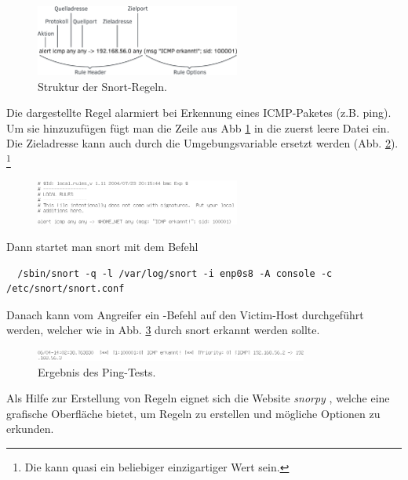 \begin{figure}[H]
\centering
\includegraphics[width=0.6\textwidth]{graphics/attacks/rule-syntax.pdf}
\caption{Struktur der Snort-Regeln.}\label{fig:snort-rule-syntax}
\end{figure}

Die dargestellte Regel alarmiert bei Erkennung eines ICMP-Paketes (z.B. ping). Um sie hinzuzufügen fügt man die Zeile aus Abb \ref{fig:snort-rule-syntax} in die zuerst leere Datei  ein. Die Zieladresse kann auch durch die Umgebungsvariable  ersetzt werden (Abb. \ref{fig:snort-localrules1}). \footnote{Die  kann quasi ein beliebiger einzigartiger Wert sein.}\\

\begin{figure}[H]
\centering
\includegraphics[width=0.6\textwidth]{graphics/attacks/localrules1.png}
\caption{}\label{fig:snort-localrules1}
\end{figure}


Dann startet man snort mit dem Befehl
\begin{verbatim}
  /sbin/snort -q -l /var/log/snort -i enp0s8 -A console -c /etc/snort/snort.conf
\end{verbatim}

Danach kann vom Angreifer ein -Befehl auf den Victim-Host durchgeführt werden, welcher wie in Abb. \ref{fig:snort-ping} durch snort erkannt werden sollte.

\begin{figure}[H]
  \centering
  \includegraphics[width=0.8\textwidth]{graphics/attacks/snort-ping.png}
  \caption{Ergebnis des Ping-Tests.}\label{fig:snort-ping}
\end{figure}

Als Hilfe zur Erstellung von Regeln eignet sich die Website \textit{snorpy} \cite{snorpy}, welche eine grafische Oberfläche bietet, um Regeln zu erstellen und mögliche Optionen zu erkunden.

